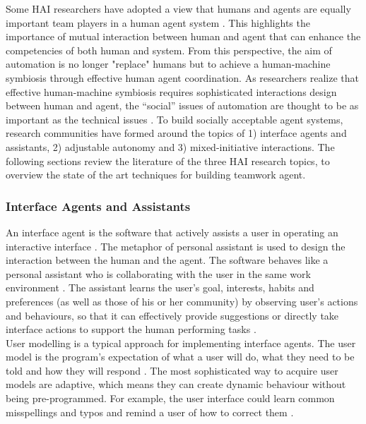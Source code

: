 Some \ac{HAI} researchers have adopted a view that humans and agents are equally important team players in a human agent system \citep{Sukthankara}. This highlights the importance of mutual interaction between human and agent that can enhance the competencies of both human and system. From this perspective, the aim of automation is no longer "replace" humans but to achieve a human-machine symbiosis through effective human agent coordination. As researchers realize that effective human-machine symbiosis requires sophisticated interactions design between human and agent, the ``social'' issues of automation are thought to be as important as the technical issues \citep{Bradshaw2011}. To build socially acceptable agent systems, research communities have formed around the topics of 1) interface agents and assistants, 2) adjustable autonomy and 3) mixed-initiative interactions. The following sections review the literature of the three \ac{HAI} research topics, to overview the state of the art techniques for building teamwork agent. 

\subsubsection{Interface Agents and Assistants}\label{sec:lrinterfaceagent}
An interface agent is the software that actively assists a user in operating an interactive interface \citep{Lieberman2003}. The metaphor of personal assistant is used to design the interaction between the human and the agent. The software behaves like a personal assistant who is collaborating with the user in the same work environment \citep{Lieberman1997}. The assistant learns the user's goal, interests, habits and preferences (as well as those of his or her community) by observing user's actions and behaviours,  so that it can effectively provide suggestions or directly take interface actions to support the human performing tasks \citep{Maes1994}.\\

User modelling is a typical approach for implementing interface agents. The user model is the program's expectation of what a user will do, what they need to be told and how they will respond \citep{Lieberman2003}.  The most sophisticated way to acquire user models are adaptive, which means they can create dynamic behaviour without being pre-programmed. For example, the user interface could learn common misspellings and typos and remind a user of how to correct them \citep{Lieberman2003}.\\

